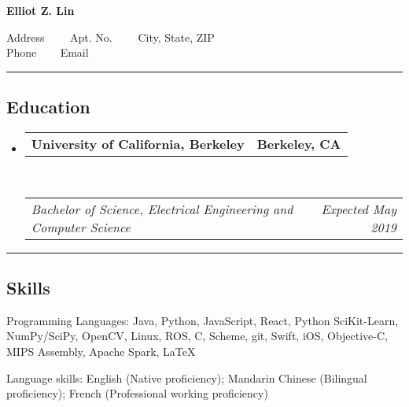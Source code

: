 \documentclass[10pt,letterpaper]{article}
\makeatletter
\newenvironment{indentsection}[1]%
{\begin{list}{}%
	{\setlength{\leftmargin}{#1}}%
	\item[]%
}
{\end{list}}
\newcommand{\headerrow}[2]
{\begin{tabular*}{\linewidth}{l@{\extracolsep{\fill}}r}
	#1 &
	#2 \\
\end{tabular*}}
\newcommand{\CPP}
{C\nolinebreak[4]\hspace{-.05em}\raisebox{.22ex}{\footnotesize\bf ++}}
\makeatother
\begin{document}
\begin{center}
{\LARGE \textbf{Elliot Z. Lin}}

Address\ \ \textbullet
\ \ Apt. No.\ \ \textbullet
\ \ City, State, ZIP
\\
Phone \ \textbullet
\ \ Email
\end{center}

\hrule
\vspace{-0.4em}
\subsection*{Education}

\begin{itemize}
	\parskip=0.1em

	\item 
	\headerrow
		{\textbf{University of California, Berkeley}}
		{\textbf{Berkeley, CA}}
	\\
	\headerrow
		{\emph{Bachelor of Science, Electrical Engineering and Computer Science}}
		{\emph{Expected May 2019}}

\end{itemize}


\hrule
\vspace{-0.4em}
\subsection*{Skills}

\begin{indentsection}{\parindent}
\begin{description*}
	\item[Programming Languages:]
	Java, Python, JavaScript, React, Python SciKit-Learn, NumPy/SciPy, OpenCV, Linux, ROS, \CPP, Scheme, git, Swift, iOS, Objective-C, MIPS Assembly, Apache Spark, \LaTeX
	\item[Language skills:] English (Native proficiency); Mandarin Chinese (Bilingual proficiency); French (Professional working proficiency)
\end{description*}
\end{indentsection}
\end{document}
